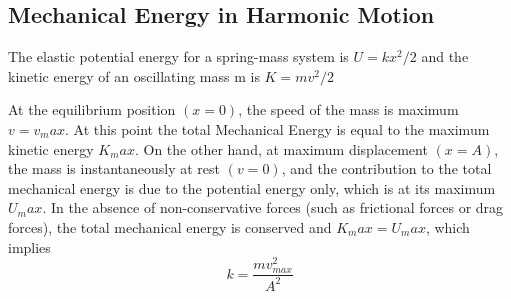 \documentclass[12pt]{article}
\begin{document}
\subsection{Mechanical Energy in Harmonic Motion}
The elastic potential energy for a spring-mass system is $U=kx^2/2$ and the kinetic energy of an oscillating mass m is $K=mv^2/2$
\par At the equilibrium position $(x=0)$, the speed of the mass is maximum $v=v_max$. At this point the total Mechanical Energy is equal to the maximum kinetic energy $K_max$. On the other hand, at maximum displacement $(x=A)$, the mass is instantaneously at rest $(v=0)$, and the contribution to the total mechanical energy is due to the potential energy only, which is at its maximum $U_max$. In the absence of non-conservative forces (such as frictional forces or drag forces), the total mechanical energy is conserved and $K_max=U_max$, which implies
\begin{equation}
k=\frac{mv^2_{max}}{A^2}
\end{equation}
\end{document}
